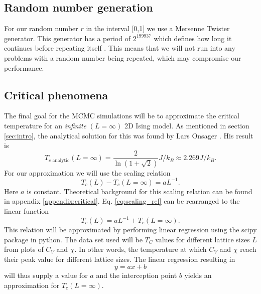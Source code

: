 \documentclass[english,notitlepage,reprint,nofootinbib]{revtex4-1}  %
\begin{document}
\subsection*{Random number generation}
For our random number $r$ in the interval [0,1] we use a Mersenne Twister generator. This generator has a period of $2^{199937}$ which defines how long it continues before repeating itself \cite{SHEMA201071}. This means that we will not run into any problems with a random number being repeated, which may compromise our performance.

\subsection*{Critical phenomena}
The final goal for the MCMC simulations will be to approximate the critical temperature for an \textit{infinite} $(L=\infty)$ 2D Ising model. As mentioned in section \ref{sec:intro}, the analytical solution for this was found by Lars Onsager \cite{project}. His result is
\begin{equation*}
    T_{c \text{ analytic}}(L=\infty) = \frac{2}{\ln(1+\sqrt{2})}J/k_B \approx 2.269 J/k_B.
\end{equation*}
For our approximation we will use the scaling relation
\begin{equation}
    T_c(L) -T_c(L=\infty) = aL^{-1}. \label{eq:scaling_rel}
\end{equation}
Here $a$ is constant. Theoretical background for this scaling relation can be found in appendix \ref{appendix:critical}. Eq. \ref{eq:scaling_rel} can be rearranged to the linear function
\begin{equation}
    T_c(L) = aL^{-1} + T_c(L=\infty). \label{eq:scaling_linear}
\end{equation}
This relation will be approximated by performing linear regression using the scipy package in python. The data set used will be $T_C$ values for different lattice sizes $L$ from plots of $C_V$ and $\chi$. In other words, the temperature at which $C_V$ and $\chi$ reach their peak value for different lattice sizes. The linear regression resulting in
\begin{equation}
    y = ax + b
\end{equation}
will thus supply a value for $a$ and the interception point $b$ yields an approximation for $T_c(L=\infty)$.
\end{document}
